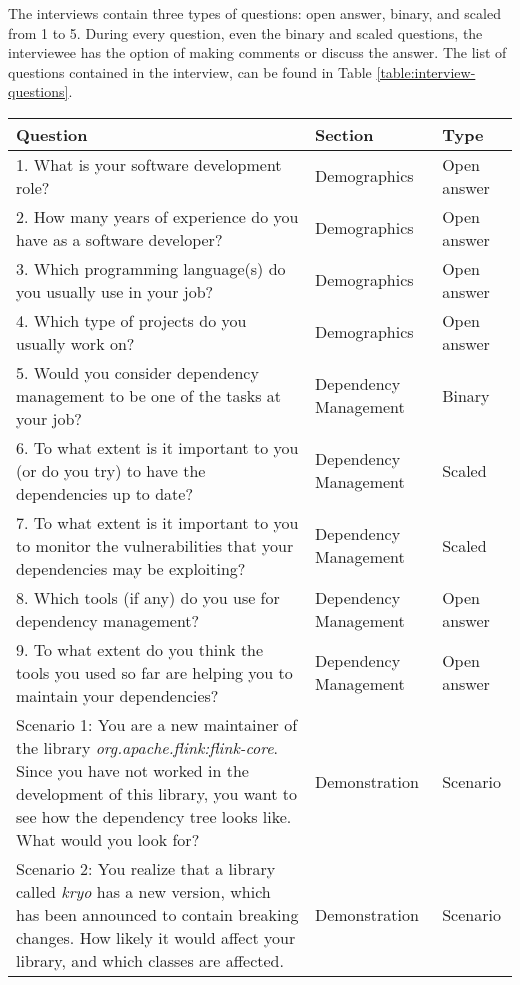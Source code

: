 The interviews contain three types of questions: open answer, binary, and scaled from 1 to 5. During every question, even the binary and scaled questions, the interviewee has the option of making comments or discuss the answer. The list of questions contained in the interview, can be found in Table \ref{table:interview-questions}.

\begin{table}[p]
    \begin{center}
    \begin{tabularx}{\textwidth}{|X|l|l|}
    \hline
    Question & Section & Type \\\hline
    \hline
    1.  What is your software development role?  & Demographics & Open answer \\\hline
    2.	How many years of experience do you have as a software developer? & Demographics & Open answer \\\hline
    3.	Which programming language(s) do you usually use in your job? & Demographics & Open answer \\\hline
    4.	Which type of projects do you usually work on? & Demographics & Open answer \\\hline
    \hline
    5.	Would you consider dependency management to be one of the tasks at your job? & Dependency Management & Binary \\\hline
    6.	To what extent is it important to you (or do you try) to have the dependencies up to date? & Dependency Management & Scaled \\\hline
    7.	To what extent is it important to you to monitor the vulnerabilities that your dependencies may be exploiting? & Dependency Management & Scaled \\\hline
    8.	Which tools (if any) do you use for dependency management? & Dependency Management & Open answer \\\hline
    9.	To what extent do you think the tools you used so far are helping you to maintain your dependencies? & Dependency Management & Open answer \\\hline
    \hline
    Scenario 1: You are a new maintainer of the library \textit{org.apache.flink:flink-core}. Since you have not worked in the development of this library, you want to see how the dependency tree looks like. What would you look for? & Demonstration & Scenario \\\hline
    Scenario 2: You realize that a library called \textit{kryo} has a new version, which has been announced to contain breaking changes. How likely it would affect your library, and which classes are affected. & Demonstration & Scenario \\\hline

\end{tabularx}
\end{center}
\end{table}
